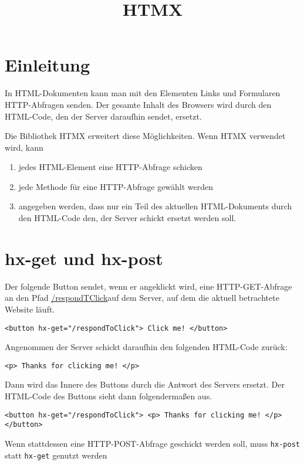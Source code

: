 \documentclass[a4paper]{scrartcl}
\date{}
\title{HTMX}
\begin{document}
\maketitle
\section{Einleitung}\label{sec: einleitung}

In HTML-Dokumenten kann man mit den Elementen Links und Formularen HTTP-Abfragen senden.
Der gesamte Inhalt des Browsers wird durch den HTML-Code, den der Server daraufhin sendet, ersetzt.

Die Bibliothek HTMX erweitert diese Möglichkeiten.
Wenn HTMX verwendet wird,
kann
\begin{enumerate}
\item jedes HTML-Element eine HTTP-Abfrage schicken
\item jede Methode für eine HTTP-Abfrage gewählt werden
\item angegeben werden, dass nur ein Teil des aktuellen HTML-Dokuments durch den HTML-Code den, der Server schickt ersetzt werden soll.
\end{enumerate}

\section{hx-get und hx-post}\label{sec:hx-get-und-hx-post}

Der folgende Button sendet, wenn er angeklickt wird, eine HTTP-GET-Abfrage an den Pfad \url{/respondTClick}auf dem Server, auf dem die aktuell betrachtete Website läuft.

\begin{verbatim}
<button hx-get="/respondToClick"> Click me! </button>
\end{verbatim}

Angenommen der Server schickt daraufhin den folgenden HTML-Code zurück:

\begin{verbatim}
<p> Thanks for clicking me! </p>
\end{verbatim}

Dann wird das Innere des Buttons durch die Antwort des Servers ersetzt.
Der HTML-Code des Buttons sieht dann folgendermaßen aus.
\begin{verbatim}
<button hx-get="/respondToClick"> <p> Thanks for clicking me! </p> </button>
\end{verbatim}

Wenn stattdessen eine HTTP-POST-Abfrage geschickt werden soll, muss \texttt{hx-post} statt \texttt{hx-get} genutzt werden
\end{document}
